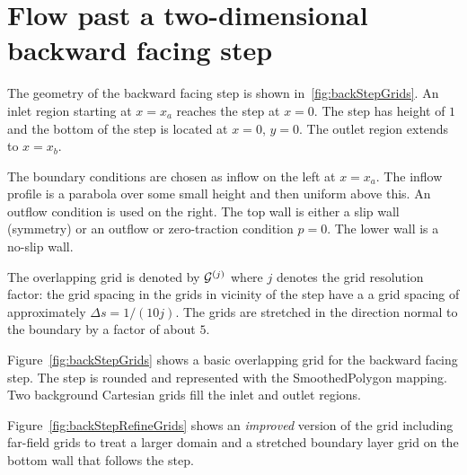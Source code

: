 \documentclass[11pt]{article}
\begin{document}
\section{Flow past a two-dimensional backward facing step}

The geometry of the backward facing step is shown in~\ref{fig:backStepGrids}. 
An inlet region starting at $x=x_a$ reaches the step at $x=0$. The step has height of $1$ and the bottom
of the step is located at $x=0$, $y=0$. The outlet region extends to $x=x_b$. 

The boundary conditions are chosen as inflow on the left at $x=x_a$. The inflow profile is a parabola
over some small height and then uniform above this. An outflow condition is used on the right.
The top wall is either a slip wall (symmetry) or an outflow or zero-traction condition $p=0$. 
The lower wall is a no-slip wall.


The overlapping grid is denoted by ${\mathcal G}^{(j)}$ where $j$ denotes the grid resolution factor: the grid spacing in the 
grids in vicinity of the step have a a grid spacing of approximately $\Delta s = 1/(10 j)$. The grids are stretched
in the direction normal to the boundary by a factor of about $5$.

Figure~\ref{fig:backStepGrids} shows a basic overlapping grid for the backward facing step.
The step is rounded and represented with the SmoothedPolygon mapping.
Two background Cartesian grids fill the inlet and outlet regions.

Figure~\ref{fig:backStepRefineGrids} shows an {\em improved} version of the grid including far-field grids
to treat a larger domain and a stretched boundary layer grid on the bottom wall that follows the step.
\end{document}
